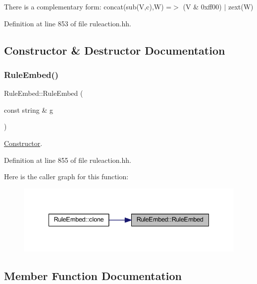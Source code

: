 There is a complementary form\+: {\ttfamily concat(sub(\+V,c),\+W) =$>$ (V \& 0xff00) $\vert$ zext(\+W)} 

Definition at line 853 of file ruleaction.\+hh.



\subsection{Constructor \& Destructor Documentation}
\mbox{\label{class_rule_embed_afb7802037e5e0905421d5da62e80e187}} 
\subsubsection{\texorpdfstring{RuleEmbed()}{RuleEmbed()}}
{\footnotesize\ttfamily Rule\+Embed\+::\+Rule\+Embed (\begin{DoxyParamCaption}\item[{const string \&}]{g }\end{DoxyParamCaption})\hspace{0.3cm}{\ttfamily [inline]}}



\mbox{\hyperlink{class_constructor}{Constructor}}. 



Definition at line 855 of file ruleaction.\+hh.

Here is the caller graph for this function\+:
\nopagebreak
\begin{figure}[H]
\begin{center}
\leavevmode
\includegraphics[width=335pt]{class_rule_embed_afb7802037e5e0905421d5da62e80e187_icgraph}
\end{center}
\end{figure}


\subsection{Member Function Documentation}
\mbox{\label{class_rule_embed_abd0eb20956c404ec4abcb2776c593086}} 
